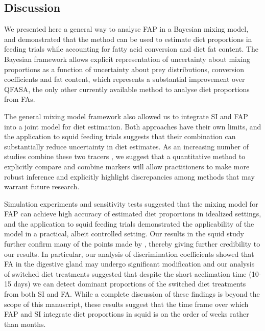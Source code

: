 \documentclass{article}%
\begin{document}
\begin{spacing}{1.9}
\begin{flushleft}
\section{Discussion}

We presented here a general way to analyse FAP in a Bayesian mixing
model, and demonstrated that the method can be used to estimate diet proportions
in feeding trials while accounting for fatty acid conversion and diet
fat content. The Bayesian framework allows explicit representation of
uncertainty about mixing proportions as a function of uncertainty
about prey distributions, conversion coefficients and fat content,
which represents a substantial improvement over QFASA, the only other
currently available method to analyse diet proportions from FAs.

The general mixing model framework also allowed us to integrate SI and
FAP into a joint model for diet estimation. Both approaches have their
own limits, and the application to squid feeding trials suggests that their combination can substantially reduce uncertainty in diet estimates. As an increasing number of studies combine
these two tracers \citep{tucker_convergence_2008,guest_evidence_2008,guest_trophic_2009,stowasser_experimental_2006,van_der_bank_dietary_2011,jaschinski_carbon_2008},
we suggest that a quantitative method to explicitly compare and combine
markers will allow practitioners to make more robust inference and
explicitly highlight discrepancies among methods that may warrant
future research.

Simulation experiments and sensitivity tests suggested that the mixing model for FAP can
achieve high accuracy of estimated diet proportions in idealized
settings, and the application to squid feeding trials demonstrated the
applicability of the model in a practical, albeit controlled setting. Our results in the
squid study further confirm many of the points made by
\citet{stowasser_experimental_2006}, thereby giving further credibility to our
results. In particular, our analysis of discrimination coefficients
showed that FA in the digestive gland may undergo significant
modification and our analysis of switched diet treatments suggested
that despite the short acclimation time (10-15 days) we can detect
dominant proportions of the switched diet treatments from both SI and
FA. While a complete discussion of these findings is beyond the scope
of this manuscript, these results suggest that the time frame over
which FAP and SI integrate diet proportions in squid is on the order of
weeks rather than months.


\end{flushleft}
\end{spacing}
\end{document}
